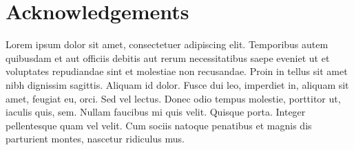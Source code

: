 \chapter*{Acknowledgements}
\noindent
Lorem ipsum dolor sit amet, consectetuer adipiscing elit. Temporibus autem quibusdam et aut officiis debitis aut rerum necessitatibus saepe eveniet ut et voluptates repudiandae sint et molestiae non recusandae. Proin in tellus sit amet nibh dignissim sagittis. Aliquam id dolor. Fusce dui leo, imperdiet in, aliquam sit amet, feugiat eu, orci. Sed vel lectus. Donec odio tempus molestie, porttitor ut, iaculis quis, sem. Nullam faucibus mi quis velit. Quisque porta. Integer pellentesque quam vel velit. Cum sociis natoque penatibus et magnis dis parturient montes, nascetur ridiculus mus.